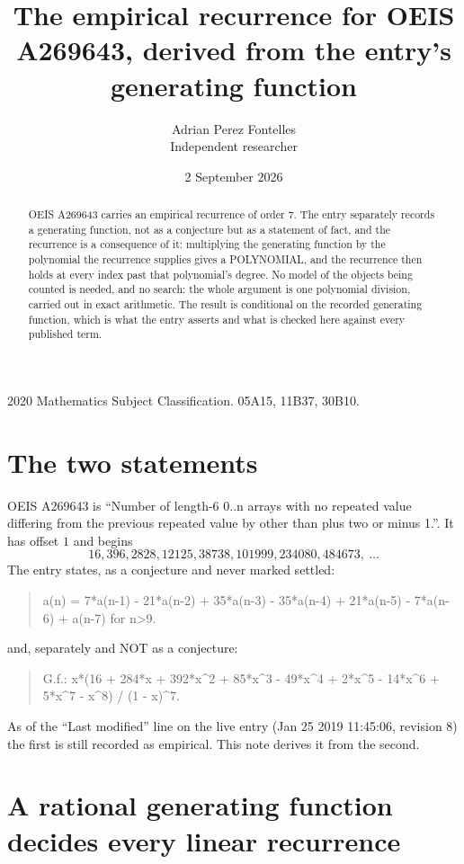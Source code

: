 \documentclass[11pt,a4paper]{article}
\title{The empirical recurrence for OEIS A269643, derived from the entry's generating function}
\author{Adrian Perez Fontelles\\ \small Independent researcher}
\date{2 September 2026}
\theoremstyle{plain}
\theoremstyle{definition}
\begin{document}
\maketitle

\begin{abstract}
OEIS A269643 carries an empirical recurrence of order $7$. The entry separately records a
generating function, not as a conjecture but as a statement of fact, and the recurrence is a
consequence of it: multiplying the generating function by the polynomial the recurrence
supplies gives a POLYNOMIAL, and the recurrence then holds at every index past that
polynomial's degree. No model of the objects being counted is needed, and no search: the
whole argument is one polynomial division, carried out in exact arithmetic. The result is
conditional on the recorded generating function, which is what the entry asserts and what is
checked here against every published term.
\end{abstract}

\noindent\small 2020 Mathematics Subject Classification. 05A15, 11B37, 30B10.\normalsize

\section{The two statements}

OEIS A269643 is ``Number of length-6 0..n arrays with no repeated value differing from the previous repeated value by other than plus two or minus 1.''. It has offset $1$ and begins
\[
16, 396, 2828, 12125, 38738, 101999, 234080, 484673,\ \dots
\]
The entry states, as a conjecture and never marked settled:
\begin{quote}
a(n) = 7*a(n-1) - 21*a(n-2) + 35*a(n-3) - 35*a(n-4) + 21*a(n-5) - 7*a(n-6) + a(n-7) for n>9.
\end{quote}
and, separately and NOT as a conjecture:
\begin{quote}
G.f.: x*(16 + 284*x + 392*x\^{}2 + 85*x\^{}3 - 49*x\^{}4 + 2*x\^{}5 - 14*x\^{}6 + 5*x\^{}7 - x\^{}8) / (1 - x)\^{}7.
\end{quote}
As of the ``Last modified'' line on the live entry (Jan 25 2019 11:45:06, revision 8) the first is still
recorded as empirical. This note derives it from the second.

\section{A rational generating function decides every linear recurrence}
\end{document}
